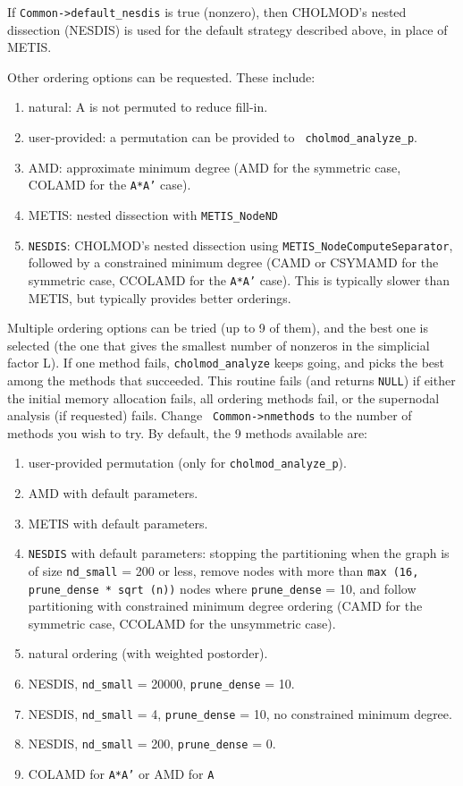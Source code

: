 \documentclass[11pt]{article}
\begin{document}
If {\tt Common->default\_nesdis} is true (nonzero), then CHOLMOD's nested
dissection (NESDIS) is used for the default strategy described above, in place
of METIS.

Other ordering options can be requested.  These include:
\begin{enumerate}
\item   natural:    A is not permuted to reduce fill-in.
\item   user-provided:      a permutation can be provided to {\tt
    cholmod\_analyze\_p}.
\item   AMD:        approximate minimum degree (AMD for the symmetric case,
    COLAMD for the {\tt A*A'} case).
\item   METIS:      nested dissection with {\tt METIS\_NodeND}
\item   {\tt NESDIS}:       CHOLMOD's nested dissection using
    {\tt METIS\_NodeComputeSeparator}, followed by a constrained minimum degree
    (CAMD or CSYMAMD for the symmetric case, CCOLAMD for the {\tt A*A'} case).
    This is typically slower than METIS, but typically provides better
    orderings.
\end{enumerate}

Multiple ordering options can be tried (up to 9 of them), and the best one is
selected (the one that gives the smallest number of nonzeros in the simplicial
factor L).  If one method fails, {\tt cholmod\_analyze} keeps going, and picks
the best among the methods that succeeded.  This routine fails (and returns
{\tt NULL}) if either the initial memory allocation fails, all ordering methods
fail, or the supernodal analysis (if requested) fails.  Change {\tt
Common->nmethods} to the number of methods you wish to try.  By default, the 9
methods available are:

\begin{enumerate}
\item user-provided permutation (only for {\tt cholmod\_analyze\_p}).
\item AMD with default parameters.
\item METIS with default parameters.
\item {\tt NESDIS} with default parameters: stopping the partitioning when
            the graph is of size {\tt nd\_small} = 200 or less, remove nodes
            with more than {\tt max (16, prune\_dense * sqrt (n))} nodes where
            {\tt prune\_dense} = 10, and follow partitioning with constrained
            minimum degree ordering (CAMD for the symmetric case, CCOLAMD for
            the unsymmetric case).
\item natural ordering (with weighted postorder).
\item NESDIS, {\tt nd\_small} = 20000, {\tt prune\_dense} = 10.
\item NESDIS, {\tt nd\_small} =     4, {\tt prune\_dense} = 10,
    no constrained minimum degree.
\item NESDIS, {\tt nd\_small} =   200, {\tt prune\_dense} = 0.
\item COLAMD for {\tt A*A'} or AMD for {\tt A}
\end{enumerate}
\end{document}
